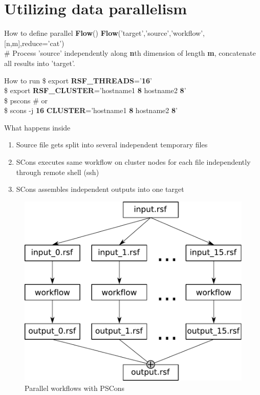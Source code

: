 \section{Utilizing data parallelism}

\begin{frame}
  \begin{block}{How to define parallel {\bf Flow}()}
    {\bf Flow}('target','source','workflow',[n,m],reduce='cat') \\
    \# Process 'source' independently along {\bf n}th dimension of length {\bf m},
    concatenate all results into 'target'.
  \end{block}
  \begin{block}{How to run}
    \$ export {\bf RSF\_THREADS}='{\bf 16}' \\
    \$ export {\bf RSF\_CLUSTER}='hostname1 {\bf 8} hostname2 {\bf 8}' \\
    \$ pscons \# or \\
    \$ scons -j {\bf 16} {\bf CLUSTER}='hostname1 {\bf 8} hostname2 {\bf 8}'
  \end{block}
  \begin{block}{What happens inside}
    \vspace{-5mm}
    \begin{enumerate}
      \item Source file gets split into several independent temporary files
      \item SCons executes same workflow on cluster nodes for each file
            independently through remote shell (ssh)
      \item SCons assembles independent outputs into one target
    \end{enumerate}
  \end{block}
\end{frame}

\begin{frame}
  \vspace{1.25cm}
  \begin{figure}
  \includegraphics[scale=0.45]{Fig/pscons.pdf}
  \caption{Parallel workflows with PSCons}
  \end{figure}
\end{frame}

